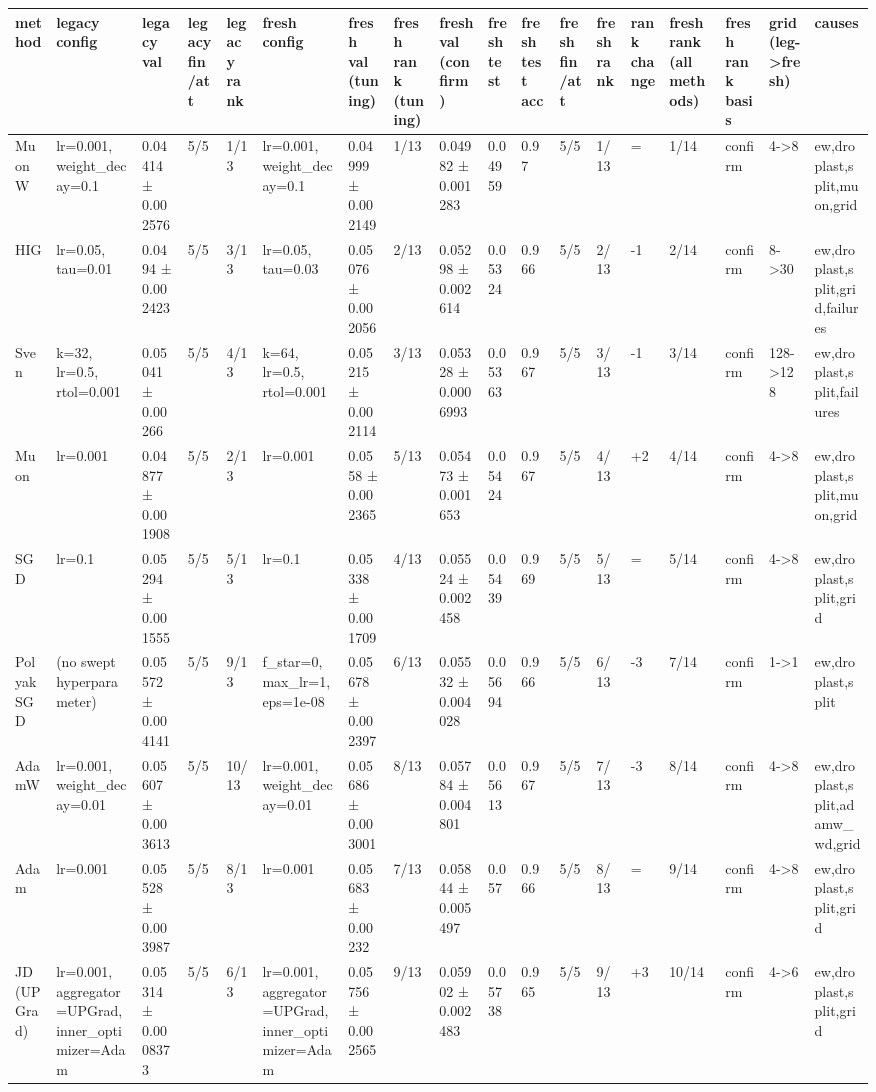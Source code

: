 \begin{tabular}{llllllllllllllllll}
\toprule
method & legacy config & legacy val & legacy fin/att & legacy rank & fresh config & fresh val (tuning) & fresh rank (tuning) & fresh val (confirm) & fresh test & fresh test acc & fresh fin/att & fresh rank & rank change & fresh rank (all methods) & fresh rank basis & grid (leg->fresh) & causes \\
\midrule
MuonW & lr=0.001, weight\_decay=0.1 & 0.04414 ± 0.002576 & 5/5 & 1/13 & lr=0.001, weight\_decay=0.1 & 0.04999 ± 0.002149 & 1/13 & 0.04982 ± 0.001283 & 0.04959 & 0.97 & 5/5 & 1/13 & = & 1/14 & confirm & 4->8 & ew,droplast,split,muon,grid \\
HIG & lr=0.05, tau=0.01 & 0.0494 ± 0.002423 & 5/5 & 3/13 & lr=0.05, tau=0.03 & 0.05076 ± 0.002056 & 2/13 & 0.05298 ± 0.002614 & 0.05324 & 0.966 & 5/5 & 2/13 & -1 & 2/14 & confirm & 8->30 & ew,droplast,split,grid,failures \\
Sven & k=32, lr=0.5, rtol=0.001 & 0.05041 ± 0.00266 & 5/5 & 4/13 & k=64, lr=0.5, rtol=0.001 & 0.05215 ± 0.002114 & 3/13 & 0.05328 ± 0.0006993 & 0.05363 & 0.967 & 5/5 & 3/13 & -1 & 3/14 & confirm & 128->128 & ew,droplast,split,failures \\
Muon & lr=0.001 & 0.04877 ± 0.001908 & 5/5 & 2/13 & lr=0.001 & 0.0558 ± 0.002365 & 5/13 & 0.05473 ± 0.001653 & 0.05424 & 0.967 & 5/5 & 4/13 & +2 & 4/14 & confirm & 4->8 & ew,droplast,split,muon,grid \\
SGD & lr=0.1 & 0.05294 ± 0.001555 & 5/5 & 5/13 & lr=0.1 & 0.05338 ± 0.001709 & 4/13 & 0.05524 ± 0.002458 & 0.05439 & 0.969 & 5/5 & 5/13 & = & 5/14 & confirm & 4->8 & ew,droplast,split,grid \\
Polyak SGD & (no swept hyperparameter) & 0.05572 ± 0.004141 & 5/5 & 9/13 & f\_star=0, max\_lr=1, eps=1e-08 & 0.05678 ± 0.002397 & 6/13 & 0.05532 ± 0.004028 & 0.05694 & 0.966 & 5/5 & 6/13 & -3 & 7/14 & confirm & 1->1 & ew,droplast,split \\
AdamW & lr=0.001, weight\_decay=0.01 & 0.05607 ± 0.003613 & 5/5 & 10/13 & lr=0.001, weight\_decay=0.01 & 0.05686 ± 0.003001 & 8/13 & 0.05784 ± 0.004801 & 0.05613 & 0.967 & 5/5 & 7/13 & -3 & 8/14 & confirm & 4->8 & ew,droplast,split,adamw\_wd,grid \\
Adam & lr=0.001 & 0.05528 ± 0.003987 & 5/5 & 8/13 & lr=0.001 & 0.05683 ± 0.00232 & 7/13 & 0.05844 ± 0.005497 & 0.057 & 0.966 & 5/5 & 8/13 & = & 9/14 & confirm & 4->8 & ew,droplast,split,grid \\
JD (UPGrad) & lr=0.001, aggregator=UPGrad, inner\_optimizer=Adam & 0.05314 ± 0.0008373 & 5/5 & 6/13 & lr=0.001, aggregator=UPGrad, inner\_optimizer=Adam & 0.05756 ± 0.002565 & 9/13 & 0.05902 ± 0.002483 & 0.05738 & 0.965 & 5/5 & 9/13 & +3 & 10/14 & confirm & 4->6 & ew,droplast,split,grid \\

\end{tabular}
